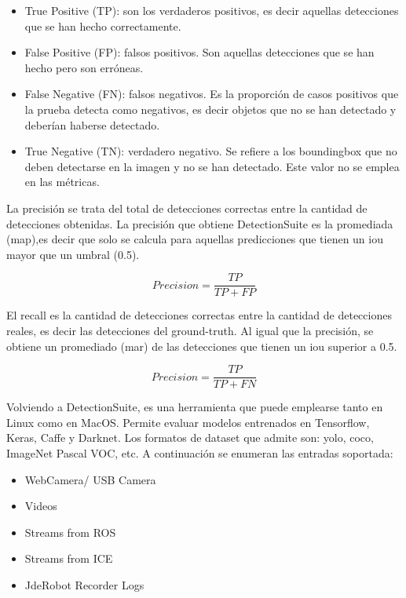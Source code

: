 \begin{itemize}
    \item True Positive (TP): son los verdaderos positivos, es decir aquellas detecciones que se han hecho correctamente.
    \item False Positive (FP): falsos positivos. Son aquellas detecciones que se han hecho pero son erróneas.
    \item False Negative (FN): falsos negativos. Es la proporción de casos positivos que la prueba detecta como negativos, es decir objetos que no se han detectado y deberían haberse detectado.
    \item True Negative (TN): verdadero negativo. Se refiere a los boundingbox que no deben detectarse en la imagen y no se han detectado. Este valor no se emplea en las métricas.
\end{itemize}

La precisión se trata del total de detecciones correctas entre la cantidad de detecciones obtenidas. La precisión que obtiene DetectionSuite es la promediada (\acrfull{map}),es decir que solo se calcula para aquellas predicciones que tienen un \acrshort{iou} mayor que un umbral (0.5).

\begin{equation}\label{precision}
Precision = \frac{TP}{TP + FP}
\end{equation}

El recall es la cantidad de detecciones correctas entre la cantidad de detecciones reales, es decir las detecciones del ground-truth. Al igual que la precisión, se obtiene un promediado (\acrfull{mar}) de las detecciones que tienen un \acrshort{iou} superior a 0.5.

\begin{equation}\label{recall}
Precision = \frac{TP}{TP + FN}
\end{equation}

Volviendo a DetectionSuite, es una herramienta que puede emplearse tanto en Linux como en MacOS. Permite evaluar modelos entrenados en Tensorflow, Keras, Caffe y Darknet. Los formatos de dataset que admite son: \acrshort{yolo}, \acrshort{coco}, ImageNet
Pascal VOC, etc. A continuación se enumeran las entradas soportada:

\begin{itemize}
    \item WebCamera/ USB Camera
    \item Videos
    \item Streams from ROS
    \item Streams from ICE
    \item JdeRobot Recorder Logs
\end{itemize}

